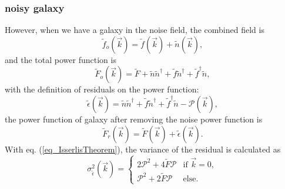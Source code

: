 \subsubsection{noisy galaxy}
However, when we have a galaxy in the noise field, the combined field is
\begin{equation}
    \tilde{f}_o(\vec{k})=\tilde{f}(\vec{k})+\tilde{n}(\vec{k}),
\end{equation}
and the total power function is
\begin{equation}
    \tilde{F}_o(\vec{k})= \tilde{F}+\tilde{n}\tilde{n}^\dagger
    +\tilde{f}\tilde{n}^{\dagger}+\tilde{f}^{\dagger}\tilde{n},
\end{equation}
with the definition of residuals on the power function:
\begin{equation}\label{eq_ps_res_gal}
    \tilde{\epsilon}(\vec{k})=\tilde{n}\tilde{n}^\dagger
    +\tilde{f}\tilde{n}^{\dagger}+\tilde{f}^{\dagger}\tilde{n}
    -\mathcal{P}(\vec{k}),
\end{equation}
the power function of galaxy after removing the noise power function is
\begin{equation}
    \tilde{F}_r(\vec{k})=\tilde{F}(\vec{k})+\tilde{\epsilon}(\vec{k}).
\end{equation}
With eq. (\ref{eq_IsserlisTheorem}), the variance of the residual is calculated
as
\begin{equation}\label{eq_var_res_noisyGal}
    \sigma^2_{\tilde{\epsilon}}(\vec{k})=
    \begin{cases}
        2\mathcal{P}^2+4\tilde{F}\mathcal{P} &\mbox{if } \vec{k}=0,\\
        \mathcal{P}^2+2\tilde{F}\mathcal{P} &\mbox{else}.
    \end{cases}
\end{equation}

